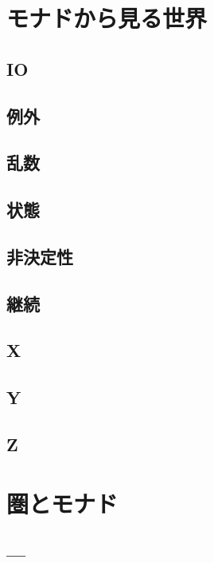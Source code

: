 \documentclass[twocolumn]{jsbook}
\begin{document}
\part{モナドから見る世界}

\chapter{IO}

\chapter{例外}

\chapter{乱数}

\chapter{状態}

\chapter{非決定性}

\chapter{継続}

\chapter{X}

\chapter{Y}

\chapter{Z}


\part{圏とモナド}


\chapter{---}
\end{document}

